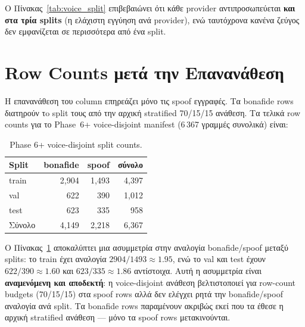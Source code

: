 Ο Πίνακας~\ref{tab:voice_split} επιβεβαιώνει ότι
κάθε provider αντιπροσωπεύεται \textbf{και στα τρία splits}
(η ελάχιστη εγγύηση ανά provider),
ενώ ταυτόχρονα κανένα ζεύγος
δεν εμφανίζεται σε περισσότερα από ένα split.

\section{Row Counts μετά την Επανανάθεση}
\label{sec:row-counts}

Η επανανάθεση του  column επηρεάζει
μόνο τις spoof εγγραφές.
Τα bonafide rows διατηρούν τo split τους από την αρχική
stratified 70/15/15 ανάθεση.
Τα τελικά row counts για το Phase~6+ voice-disjoint manifest
(6\,367 γραμμές συνολικά) είναι:

\begin{table}[ht]
  \centering
  \begin{tabular}{lrrr}
    \toprule
    Split & bonafide & spoof & σύνολο \\
    \midrule
    train & 2{,}904 & 1{,}493 & 4{,}397 \\
    val   &   622 &   390 & 1{,}012 \\
    test  &   623 &   335 &   958 \\
    \midrule
    Σύνολο & 4{,}149 & 2{,}218 & 6{,}367 \\
    \bottomrule
  \end{tabular}
  \caption{Phase 6+ voice-disjoint split counts.}
  \label{tab:voice_split_counts}
\end{table}

Ο Πίνακας~\ref{tab:voice_split_counts} αποκαλύπτει
μια ασυμμετρία στην αναλογία bonafide/spoof μεταξύ splits:
το train έχει αναλογία $2904/1493 \approx 1.95$,
ενώ το val και test έχουν $622/390 \approx 1.60$
και $623/335 \approx 1.86$ αντίστοιχα.
Αυτή η ασυμμετρία είναι \textbf{αναμενόμενη και αποδεκτή}:
η voice-disjoint ανάθεση βελτιστοποιεί
για row-count budgets (70/15/15) στα spoof rows
αλλά δεν ελέγχει ρητά την bonafide/spoof αναλογία ανά split.
Τα bonafide rows παραμένουν ακριβώς εκεί που τα έθεσε
η αρχική stratified ανάθεση —
μόνο τα spoof rows μετακινούνται.

